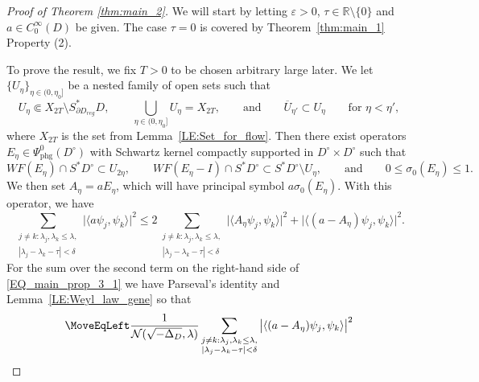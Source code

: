 \documentclass[11pt,twoside,reqno]{amsart}
\newcommand{\R}{\mathbb{R}}
\newcommand{\1}{\mathrm{\mathbf{1}}}
\numberwithin{equation}{section}
\theoremstyle{plain}
\theoremstyle{definition}
\theoremstyle{remark}
\begin{document}
\begin{proof}[Proof of Theorem \ref{thm:main_2}]
We will start by letting $\varepsilon>0$, $\tau\in\R \setminus\{0\}$ and $a\in C_0^\infty(D)$ be given. The case $\tau=0$ is covered by Theorem~\ref{thm:main_1} Property (2).

To prove the result, we fix $T>0$ to be chosen arbitrary large later. We let $\{U_\eta\}_{\eta\in(0,\eta_0]}$ be a nested family of open sets such that 
\begin{equation*}
    U_\eta \Subset X_{2T}\setminus S^{*}_{\partial D_{reg}} D,\qquad \bigcup_{\eta\in(0,\eta_0]} U_\eta = X_{2T}, \qquad\text{and}\qquad \overline{U}_{\eta'} \subset U_\eta \qquad\text{for $\eta<\eta'$},
\end{equation*} 
where $X_{2T}$ is the set from Lemma~\ref{LE:Set_for_flow}. Then there exist operators $E_\eta \in \Psi^0_{\mathrm{phg}}(D^{\circ})$ with Schwartz kernel compactly supported in $D^{\circ}\times D^{\circ}$ such that
\begin{equation*}
    WF(E_\eta) \cap S^{*}D^{\circ} \subset U_{2\eta}, \qquad WF(E_\eta - I) \cap S^{*}D^{\circ} \subset S^{*}D^{\circ} \setminus U_{\eta}, \qquad\text{and}\qquad 0\leq \sigma_0(E_\eta)\leq 1.
\end{equation*}
We then set $A_\eta = a E_\eta $, which will have principal symbol $a\sigma_0(E_\eta)$. With this operator, we have
\begin{equation}\label{EQ_main_prop_3_1}
    \sum_{\substack{j\neq k: \lambda_j,\lambda_k\leq \lambda,  \\ |\lambda_{j}-\lambda_{k}-\tau| < \delta}} \big| \langle a \psi_j , \psi_k\rangle  \big|^2 
    \leq 2\sum_{\substack{j\neq k: \lambda_j,\lambda_k\leq \lambda,  \\ |\lambda_{j}-\lambda_{k}-\tau| < \delta}} \big| \langle A_\eta \psi_j , \psi_k\rangle  \big|^2 + \big| \langle (a- A_\eta) \psi_j , \psi_k\rangle  \big|^2.
\end{equation}
%
For the sum over the second term on the right-hand side of \eqref{EQ_main_prop_3_1} we have Parseval's identity and Lemma~\ref{LE:Weyl_law_gene} so that
%
\begin{equation}\label{EQ_main_prop_3_2}
    \begin{aligned}
    \MoveEqLeft \frac{1}{\mathcal{N}(\sqrt{-\Delta_D},\lambda)}\sum_{\substack{j\neq k: \lambda_j,\lambda_k\leq \lambda,  \\ |\lambda_{j}-\lambda_{k}-\tau| < \delta}} \big| \langle (a- A_\eta) \psi_j , \psi_k\rangle \big|^2 
    \\

\end{aligned}
\end{equation}
\end{proof}
\end{document}
